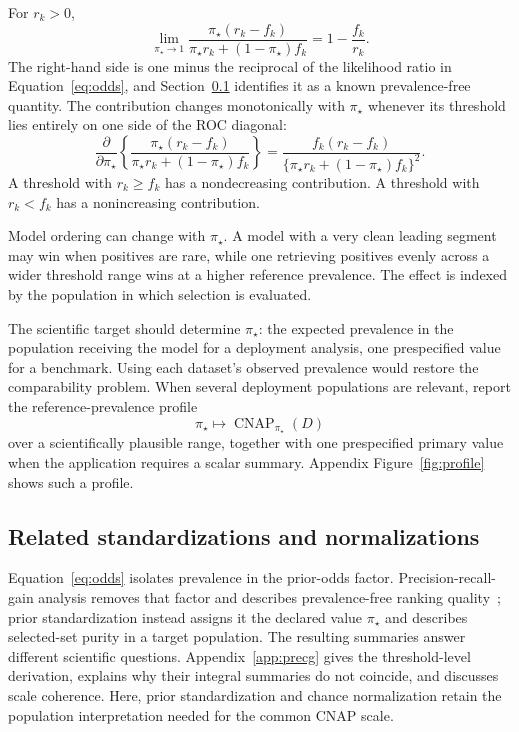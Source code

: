 \documentclass[11pt]{article}
\newcommand{\CNAP}{\operatorname{CNAP}}
\newcommand{\Tpi}{\CNAP_{\pi_\star}}
\theoremstyle{remark}
\begin{document}
For $r_k>0$,
\begin{equation}
\lim_{\pi_\star\to1}
\frac{\pi_\star(r_k-f_k)}
{\pi_\star r_k+(1-\pi_\star)f_k}
=
1-\frac{f_k}{r_k}.
\label{eq:precg-limit}
\end{equation}
The right-hand side is one minus the reciprocal of the likelihood ratio in Equation~\eqref{eq:odds}, and Section~\ref{sec:related-normalizations} identifies it as a known prevalence-free quantity. The contribution changes monotonically with $\pi_\star$ whenever its threshold lies entirely on one side of the ROC diagonal:
\begin{equation}
\frac{\partial}{\partial\pi_\star}
\left\{
\frac{\pi_\star(r_k-f_k)}
{\pi_\star r_k+(1-\pi_\star)f_k}
\right\}
=
\frac{f_k(r_k-f_k)}
{\{\pi_\star r_k+(1-\pi_\star)f_k\}^2}.
\label{eq:reference-prevalence-derivative}
\end{equation}
A threshold with $r_k\geq f_k$ has a nondecreasing contribution. A threshold with $r_k<f_k$ has a nonincreasing contribution.

Model ordering can change with $\pi_\star$. A model with a very clean leading segment may win when positives are rare, while one retrieving positives evenly across a wider threshold range wins at a higher reference prevalence. The effect is indexed by the population in which selection is evaluated.

The scientific target should determine $\pi_\star$: the expected prevalence in the population receiving the model for a deployment analysis, one prespecified value for a benchmark. Using each dataset's observed prevalence would restore the comparability problem. When several deployment populations are relevant, report the reference-prevalence profile
\[
\pi_\star
\longmapsto
\Tpi(D)
\]
over a scientifically plausible range, together with one prespecified primary value when the application requires a scalar summary. Appendix Figure~\ref{fig:profile} shows such a profile.

\subsection{Related standardizations and normalizations}
\label{sec:related-normalizations}

Equation~\eqref{eq:odds} isolates prevalence in the prior-odds factor. Precision-recall-gain analysis removes that factor and describes prevalence-free ranking quality~\cite{flach2015prg}; prior standardization instead assigns it the declared value $\pi_\star$ and describes selected-set purity in a target population. The resulting summaries answer different scientific questions. Appendix~\ref{app:precg} gives the threshold-level derivation, explains why their integral summaries do not coincide, and discusses scale coherence. Here, prior standardization and chance normalization retain the population interpretation needed for the common CNAP scale.
\end{document}
